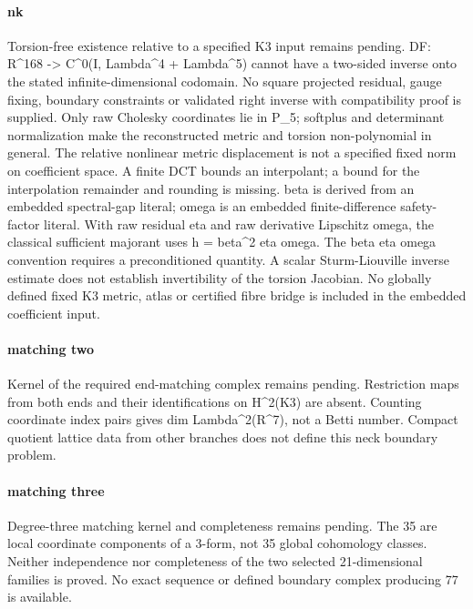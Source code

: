 \paragraph{nk} Torsion-free existence relative to a specified K3 input remains pending. DF: R\textasciicircum{}168 -> C\textasciicircum{}0(I, Lambda\textasciicircum{}4 + Lambda\textasciicircum{}5) cannot have a two-sided inverse onto the stated infinite-dimensional codomain. No square projected residual, gauge fixing, boundary constraints or validated right inverse with compatibility proof is supplied. Only raw Cholesky coordinates lie in P\_5; softplus and determinant normalization make the reconstructed metric and torsion non-polynomial in general. The relative nonlinear metric displacement is not a specified fixed norm on coefficient space. A finite DCT bounds an interpolant; a bound for the interpolation remainder and rounding is missing. beta is derived from an embedded spectral-gap literal; omega is an embedded finite-difference safety-factor literal. With raw residual eta and raw derivative Lipschitz omega, the classical sufficient majorant uses h = beta\textasciicircum{}2 eta omega. The beta eta omega convention requires a preconditioned quantity. A scalar Sturm-Liouville inverse estimate does not establish invertibility of the torsion Jacobian. No globally defined fixed K3 metric, atlas or certified fibre bridge is included in the embedded coefficient input.

\paragraph{matching two} Kernel of the required end-matching complex remains pending. Restriction maps from both ends and their identifications on H\textasciicircum{}2(K3) are absent. Counting coordinate index pairs gives dim Lambda\textasciicircum{}2(R\textasciicircum{}7), not a Betti number. Compact quotient lattice data from other branches does not define this neck boundary problem.

\paragraph{matching three} Degree-three matching kernel and completeness remains pending. The 35 are local coordinate components of a 3-form, not 35 global cohomology classes. Neither independence nor completeness of the two selected 21-dimensional families is proved. No exact sequence or defined boundary complex producing 77 is available.

